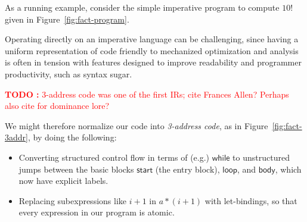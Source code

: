 \documentclass[acmsmall,screen,review]{acmart}
\newcounter{todos}
\newcommand{\TODO}[1]{{
  \stepcounter{todos}
  \begin{center}\large{\textcolor{red}{\textbf{TODO \arabic{todos}:} #1}}\end{center}
}}
\newcommand{\ms}[1]{\ensuremath{\mathsf{#1}}}
\begin{document}
As a running example, consider the simple imperative program to compute $10!$ given in
Figure~\ref{fig:fact-program}. 

Operating directly on an imperative language can be challenging, since having a uniform
representation of code friendly to mechanized optimization and analysis is often in tension with
features designed to improve readability and programmer productivity, such as syntax sugar. 


\TODO{3-address code was one of the first IRs; cite Frances Allen? Perhaps also cite
\cite{allen-70-cfa} for dominance lore?}

We might therefore normalize our code into \textit{3-address code}, as in
Figure~\ref{fig:fact-3addr}, by doing the following:
\begin{itemize}
  \item Converting structured control flow in terms of (e.g.) \ms{while} to unstructured jumps
  between the basic blocks \ms{start} (the entry block), \ms{loop}, and \ms{body}, which now have
  explicit labels. 
  \item Replacing subexpressions like $i + 1$ in $a * (i + 1)$ with let-bindings, so that every
  expression in our program is atomic. 
\end{itemize}
\end{document}
